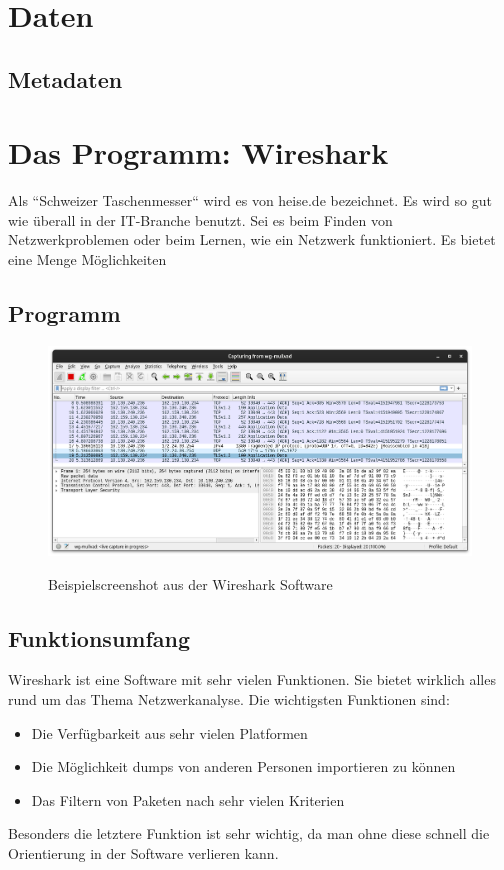 \documentclass[12pt]{article}
\begin{document}
\section{Daten}
\subsection{Metadaten}



\section{Das Programm: Wireshark}

Als ``Schweizer Taschenmesser``\cite{schweizer-taschenmesser} wird es von heise.de bezeichnet. Es wird so gut wie überall in der IT-Branche benutzt. Sei es beim Finden von Netzwerkproblemen oder beim Lernen, wie ein Netzwerk funktioniert. Es bietet eine Menge Möglichkeiten
\subsection{Programm}



\begin{figure}[h]
	\begin{center}
		\includegraphics[scale=0.25]{Bilder/Screenshot_1.png}
		\label{fig:figure2}
		\caption{Beispielscreenshot aus der Wireshark Software}
	\end{center}
\end{figure}


\subsection{Funktionsumfang}

Wireshark ist eine Software mit sehr vielen Funktionen. Sie bietet wirklich alles rund um das Thema Netzwerkanalyse. Die wichtigsten Funktionen sind:
\begin{itemize}
	\item Die Verfügbarkeit aus sehr vielen Platformen
	\item Die Möglichkeit dumps von anderen Personen importieren zu können
	\item Das Filtern von Paketen nach sehr vielen Kriterien
\end{itemize}
Besonders die letztere Funktion ist sehr wichtig, da man ohne diese schnell die Orientierung in der Software verlieren kann. \cite{features}
\end{document}
